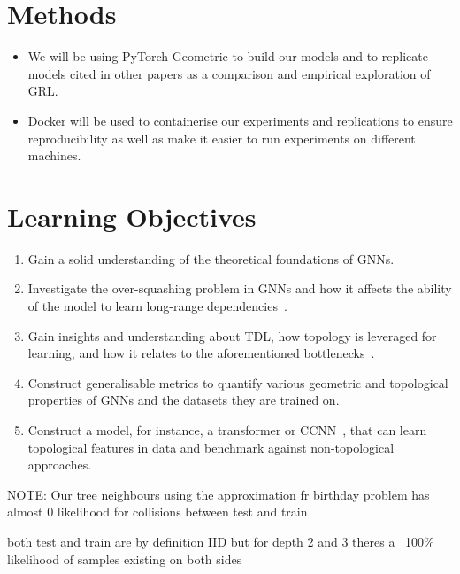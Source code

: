 \documentclass[a4paper,12pt]{article}
\begin{document}
\section{Methods}
\begin{itemize}
	\item  We will be using PyTorch Geometric to build our models and to replicate models cited in other papers as a comparison and empirical exploration of GRL.
	\item Docker will be used to containerise our experiments and replications to ensure reproducibility as well as make it easier to run experiments on different machines.
\end{itemize}

\section{Learning Objectives}


\begin{enumerate}
	\item Gain a solid understanding of the theoretical foundations of GNNs.
	\item Investigate the over-squashing problem in GNNs and how it affects the ability of the model to learn long-range dependencies~\cite{alon_bottleneck_2021}.
	\item Gain insights and understanding about TDL, how topology is leveraged for learning, and how it relates to the aforementioned bottlenecks~\cite{horn_topological_2022}.
	\item Construct generalisable metrics to quantify various geometric and topological properties of GNNs and the datasets they are trained on.
	\item Construct a model, for instance, a transformer or CCNN~\cite{tdlbook}, that can learn topological features in data and benchmark against non-topological approaches.
\end{enumerate}

NOTE:
Our tree neighbours using the approximation fr birthday problem has almost 0 likelihood for collisions between test and train

both test and train are by definition IID but for depth 2 and 3 theres a ~100\% likelihood of samples existing on both sides


\printbibliography
\end{document}

